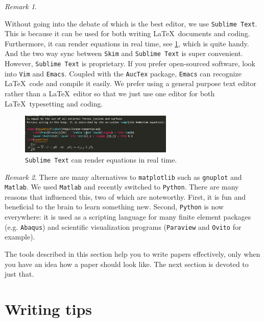 \documentclass[authoryear,12pta4paper,fleqn]{article}
\numberwithin{equation}{section}
\theoremstyle{remark}
\newtheorem{rmk}{Remark}
\begin{document}
\begin{rmk}\label{rm:a}

Without going into the debate of which is the best editor, we use \texttt{Sublime Text}. This is
because it can be used for both writing \LaTeX\ documents and coding. Furthermore, it can render equations in real time, see  \cref{fig:sublime-text}, which is quite handy. And the two way sync between \texttt{Skim} and \texttt{Sublime Text} is super convenient. However, \texttt{Sublime Text} is proprietary. If you prefer open-sourced software, look into \texttt{Vim} and \texttt{Emacs}. Coupled with the \texttt{AucTex} package, \texttt{Emacs} can recognize \LaTeX\ code and compile it easily. We prefer using a general purpose text editor rather than a \LaTeX\ editor so that we just use one editor  for both \LaTeX\ typesetting and coding. 


\begin{figure}[h!]
  \centering 
   \includegraphics[width=0.65\textwidth]{sublime-text}
   \caption{\texttt{Sublime Text} can render equations in real time.}
\label{fig:sublime-text}
\end{figure}
\end{rmk}

\begin{rmk}\label{rm:a}
There are many alternatives to \texttt{matplotlib} such as \texttt{gnuplot} and \texttt{Matlab}. We used  \texttt{Matlab} and recently switched to \texttt{Python}. There are many reasons that influenced this, two of which are noteworthy. First, it is fun and beneficial to the brain to learn something new. Second, \texttt{Python} is now everywhere: it is used as a scripting language for many finite element packages (e.g. \texttt{Abaqus}) and scientific visualization programs (\texttt{Paraview} and \texttt{Ovito} for example).
\end{rmk}


The tools described in this section help you to write papers effectively, only when you have an idea how a paper should look like. The next section is devoted to just that. 

\section{Writing tips}\label{sec:writing-tips}
\end{document}
